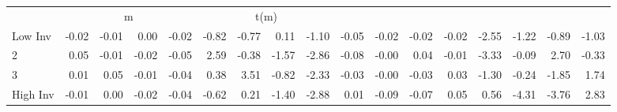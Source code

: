 \begin{table}[!ht]
\begin{tabular}{lrrrrrrrrrrrrrrrr}
      & \multicolumn{4}{c}{m} & \multicolumn{4}{c}{t(m)}
    
    \\
      \cmidrule(r){2-5} \cmidrule(r){6-9} \cmidrule(r){10-13} \cmidrule(r){14-17}

    Low Inv   & -0.02  & -0.01  & 0.00  & -0.02  & -0.82  & -0.77  & 0.11  & -1.10  & -0.05  & -0.02  & -0.02  & -0.02  & -2.55  & -1.22  & -0.89  & -1.03  \\
           2  & 0.05  & -0.01  & -0.02  & -0.05  & 2.59  & -0.38  & -1.57  & -2.86  & -0.08  & -0.00  & 0.04  & -0.01  & -3.33  & -0.09  & 2.70  & -0.33  \\
           3  & 0.01  & 0.05  & -0.01  & -0.04  & 0.38  & 3.51  & -0.82  & -2.33  & -0.03  & -0.00  & -0.03  & 0.03  & -1.30  & -0.24  & -1.85  & 1.74  \\
    High Inv  & -0.01  & 0.00  & -0.02  & -0.04  & -0.62  & 0.21  & -1.40  & -2.88  & 0.01  & -0.09  & -0.07  & 0.05  & 0.56  & -4.31  & -3.76  & 2.83  \\

  

  \bottomrule
\end{tabular}
\label{tbl:32_Size_OP_Inv_F17}
\end{table}